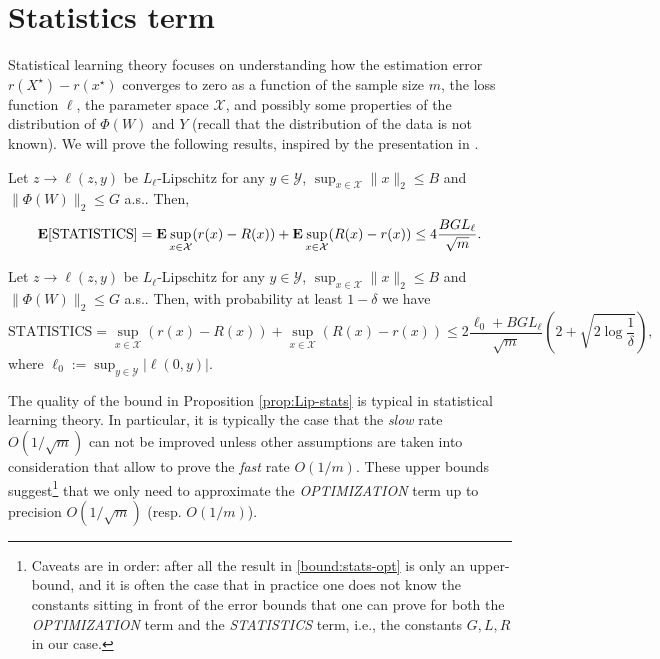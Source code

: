 \section{Statistics term}
\label{sec:Statistical learning theory}
Statistical learning theory focuses on understanding how the estimation error $r(X^\star) - r(x^\star)$ converges to zero as a function of the sample size $m$, the loss function $\ell$, the parameter space $\mathcal{X}$, and possibly some properties of the distribution of $\Phi(W)$ and $Y$ (recall that the distribution of the data is not known). We will prove the following results, inspired by the presentation in \cite{bach}.

\begin{proposition}[Mean]
\label{prop:Lip-stats mean}
Let $z\rightarrow \ell(z,y)$ be $L_\ell$-Lipschitz for any $y\in\mathcal{Y}$, $\sup_{x\in\mathcal{X}}\|x\|_2 \le B$ and $\|\Phi(W)\|_2\le G$ a.s.. Then,
$$
	\mathbf{E}[\textrm{STATISTICS}] = \mathbf{E} \sup_{x\in\mathcal{X}} ( r(x) - R(x) ) + \mathbf{E} \sup_{x\in\mathcal{X}} ( R(x) - r(x) )
	\le 4\frac{BGL_\ell}{\sqrt{m}}.
$$
\end{proposition}

\begin{proposition}
\label{prop:Lip-stats}
Let $z\rightarrow \ell(z,y)$ be $L_\ell$-Lipschitz for any $y\in\mathcal{Y}$, $\sup_{x\in\mathcal{X}}\|x\|_2 \le B$ and $\|\Phi(W)\|_2\le G$ a.s.. Then, with probability at least $1-\delta$ we have
$$
	\textrm{STATISTICS} = \sup_{x\in\mathcal{X}} ( r(x) - R(x) ) + \sup_{x\in\mathcal{X}} ( R(x) - r(x) )
	\le 2\frac{\ell_0+BGL_\ell}{\sqrt{m}}\left(2 + \sqrt{2\log \frac{1}{\delta}} \right),
$$
where $\ell_0:=\sup_{y\in\mathcal{Y}} | \ell(0,y) |$.
\end{proposition}

The quality of the bound in Proposition \ref{prop:Lip-stats} is typical in statistical learning theory. In particular, it is typically the case that the \emph{slow} rate $O(1/\sqrt{m})$ can not be improved unless other assumptions are taken into consideration that allow to prove the \emph{fast} rate $O(1/m)$. These upper bounds suggest\footnote{Caveats are in order: after all the result in \eqref{bound:stats-opt} is only an upper-bound, and it is often the case that in practice one does not know the constants sitting in front of the error bounds that one can prove for both the \emph{OPTIMIZATION} term and the \emph{STATISTICS} term, i.e., the constants $G,L,R$ in our case.} that we only need to approximate the \emph{OPTIMIZATION} term up to precision $O(1/\sqrt{m})$ (resp. $O(1/m)$).

